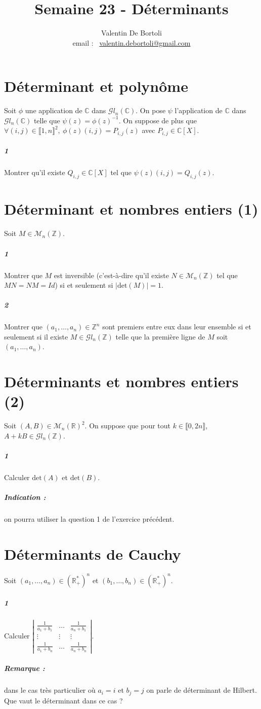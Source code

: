 \documentclass[10pt,a4paper]{article}
\title{Semaine 23 - Déterminants }
\author{Valentin De Bortoli \\ email : \ \href{mailto:valentin.debortoli@gmail.com}{valentin.debortoli@gmail.com}}
\date{}
\begin{document}
\maketitle
\section{Déterminant et polynôme}
Soit $\phi$ une application de $\mathbb{C}$ dans $\mathcal{G}l_n \left(\mathbb{C} \right)$. On pose $\psi$ l'application de $\mathbb{C}$ dans $\mathcal{G}l_n \left(\mathbb{C} \right)$ telle que $\psi(z) = \phi(z)^{-1}$. On suppose de plus que $\forall (i,j) \in \llbracket 1,n \rrbracket^2, \ \phi(z)(i,j)=P_{i,j}(z)$ avec $P_{i,j} \in \mathbb{C}[X]$.
\subparagraph{1}Montrer qu'il existe $Q_{i,j} \in \mathbb{C}[X]$ tel que $\psi(z)(i,j) = Q_{i,j}(z)$.
\section{Déterminant et nombres entiers (1)}
Soit $M \in \mathcal{M}_n \left( \mathbb{Z} \right)$.
\subparagraph{1}Montrer que $M$ est inversible (c'est-à-dire qu'il existe $N \in \mathcal{M}_n \left( \mathbb{Z} \right)$ tel que $MN =NM=Id$) si et seulement si $\vert \text{det}(M) \vert=1$.
\subparagraph{2}Montrer que $(a_1,\dots,a_n) \in \mathbb{Z}^n$ sont premiers entre eux dans leur ensemble si et seulement si il existe $M\in \mathcal{G}l_n \left( \mathbb{Z} \right)$ telle que la première ligne de $M$ soit $(a_1,\dots,a_n)$.

\section{Déterminants et nombres entiers (2)}
Soit $(A,B) \in \mathcal{M}_n\left( \mathbb{R} \right)^2$. On suppose que pour tout $k \in \llbracket 0,2n \rrbracket$, $A+kB \in \mathcal{G}l_n\left( \mathbb{Z} \right)$.
\subparagraph{1}Calculer $\text{det}(A)$ et $\text{det}(B)$.
\subparagraph{Indication :} on pourra utiliser la question 1 de l'exercice précédent.

\section{Déterminants de Cauchy}
Soit $(a_1,\dots,a_n) \in \left(\mathbb{R}_+^*\right)^n$ et $(b_1,\dots,b_n) \in \left(\mathbb{R}_+^*\right)^n$.
\subparagraph{1}Calculer $\left| \begin{matrix} \frac{1}{a_1+b_1} & \dots & \frac{1}{a_n+b_1} \\
\vdots & \vdots & \vdots \\ \frac{1}{a_1+b_n} & \dots & \frac{1}{a_n+b_n}\end{matrix}\right|$.
\subparagraph{Remarque :} dans le cas très particulier où $a_i=i$ et $b_j=j$ on parle de déterminant de Hilbert. Que vaut le déterminant dans ce cas ?
\end{document}
